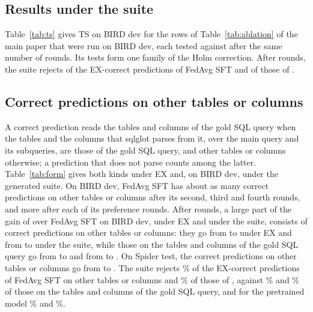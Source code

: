 \subsection{Results under the suite}

Table~\ref{tab:ts} gives TS on BIRD dev for the rows of
Table~\ref{tab:ablation} of the main paper that were run on BIRD dev,
each tested against \method{} after the same number of rounds. Its tests
form one family of the Holm correction. After 
rounds, the suite rejects  of the
EX-correct predictions of FedAvg SFT and  of
those of \method.

\begin{table}[!ht]
\caption{EX and TS (\%) on BIRD dev, TS under the generated suite.
$\Delta$ and $p$ compare the TS of each row with that of \method{} after
the same number of rounds; the rows are those of
Table~\ref{tab:ablation} of the main paper.}\label{tab:ts}
\footnotesize

\end{table}

\subsection{Correct predictions on other tables or columns}\label{sup:form}

A correct prediction reads the tables and columns of the gold SQL query
when the tables and the columns that sqlglot parses from it, over the
main query and its subqueries, are those of the gold SQL query, and other
tables or columns otherwise; a prediction that does not parse counts
among the latter. Table~\ref{tab:form} gives both kinds under EX and, on
BIRD dev, under the generated suite. On BIRD dev, FedAvg SFT has about as
many correct predictions on other tables or columns after its second,
third and fourth rounds, and \method{} more after each of its preference
rounds. After  rounds, a large part of the gain
of \method{} over FedAvg SFT on BIRD dev, under EX and under the suite,
consists of correct predictions on other tables or columns: they go from
 to
 under EX and from
 to
 under the suite, while those on the
tables and columns of the gold SQL query go from
 to 
and from  to
. On Spider test, the correct
predictions on other tables or columns go from
 to
. The suite rejects
\% of the EX-correct
predictions of FedAvg SFT on other tables or columns and
\% of those of \method, against
\% and
\% of those on the tables and
columns of the gold SQL query, and for the pretrained model
\% and
\%.

